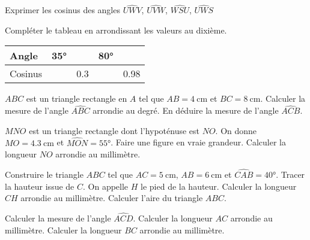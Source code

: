 \documentclass["../Cours.tex"]{subfiles}
\begin{document}
\begin{questions}
    \exercice Exprimer les cosinus des angles $\widehat{UWV}$, $\widehat{UVW}$, $\widehat{WSU}$, $\widehat{UWS}$
    \begin{center}
    \end{center}

    \exercice Compléter le tableau en arrondissant les valeurs au dixième.

    \begin{center}
    \begin{tabularx}{0.5\linewidth}{|l|X|X|X|X|}\hline 
    Angle & \ang{35} & & \ang{80} & \\\hline
    Cosinus &  & \num{0.3} &  & \num{0.98} \\\hline
    \end{tabularx}
    \end{center}

    \exercice $ABC$ est un triangle rectangle en $A$ tel que $AB=\qty{4}{\centi\metre}$ et $BC=\qty{8}{\centi\metre}$.
    \question Calculer la mesure de l'angle $\widehat{ABC}$ arrondie au degré.
    \question En déduire la mesure de l'angle $\widehat{ACB}$.

    \exercice $MNO$ est un triangle rectangle dont l'hypoténuse est $NO$. On donne $MO=\qty{4.3}{\centi\metre}$ et $\widehat{MON} = \ang{55}$.
    \question Faire une figure en vraie grandeur.
    \question Calculer la longueur $NO$ arrondie au millimètre.

    \exercice 
    \question Construire le triangle $ABC$ tel que $AC=\qty{5}{\centi\metre}$, $AB=\qty{6}{\centi\metre}$ et $\widehat{CAB} = \ang{40}$.
    \question Tracer la hauteur issue de $C$. On appelle $H$ le pied de la hauteur.
    \question Calculer la longueur $CH$ arrondie au millimètre.
    \question Calculer l'aire du triangle $ABC$.

    \exercice 
    \begin{center}
    \end{center}
    \question Calculer la mesure de l'angle $\widehat{ACD}$.
    \question Calculer la longueur $AC$ arrondie au millimètre.
    \question Calculer la longueur $BC$ arrondie au millimètre.


\end{questions}
\end{document}
